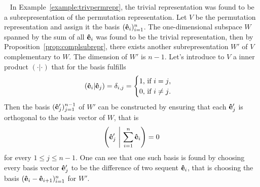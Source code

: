 \begin{example}~\label{example:comptrivpermrepr}
	In Example~\ref{example:trivpermrepr}, the trivial representation was found to be a subrepresentation of the permutation representation. Let $V$ be the permutation representation  and assign it the basis $(\mathbf{\hat{e}}_i)_{i=1}^n$. The one-dimensional subspace $W$ spanned by the sum of all $\mathbf{\hat{e}}_i$ was found to be the trivial representation, then by Proposition~\ref{prop:complsubrepr}, there exists another subrepresentation $W'$ of $V$ complementary to $W$. The dimension of $W'$ is $n-1$. Let's introduce to $V$ a inner product $(\cdot|\cdot)$ that for the basis fulfills
	\begin{align*}
		(\mathbf{\hat{e}}_i|\mathbf{\hat{e}}_j) = \delta_{i,j} = \begin{cases}
			1 \text{, if $i=j$,}\\
			0 \text{, if $i \neq j$.}
		\end{cases}
	\end{align*}
	Then the basis $(\mathbf{\hat{e}}'_j)_{j=1}^{n-1}$ of $W'$ can be constructed by ensuring that each $\mathbf{\hat{e}}'_j$ is orthogonal to the basis vector of $W$, that is
	\begin{align*}
		\left( \mathbf{\hat{e}}'_j \ \middle\vert \ \sum_{i=1}^n \mathbf{\hat{e}}_i \right) = 0
	\end{align*}
	for every $1 \leq j \leq n-1$. One can see that one such basis is found by choosing every basis vector $\mathbf{\hat{e}}'_j$ to be the difference of two sequent $\mathbf{\hat{e}}_i$, that is choosing the basis $(\mathbf{\hat{e}}_i - \mathbf{\hat{e}}_{i+1})_{i=1}^n$ for $W'$.
\end{example}
